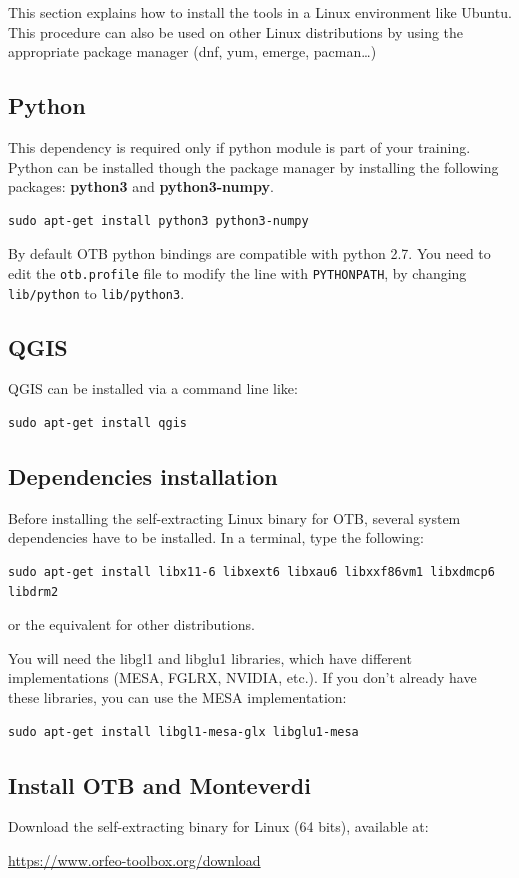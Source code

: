 \documentclass[10pt,a4paper]{article}
\begin{document}
This section explains how to install the tools in a Linux environment like Ubuntu. This procedure can also be used on other Linux distributions by using the appropriate package manager (dnf, yum,
emerge, pacman\ldots)

\subsection{Python}

This dependency is required only if python module is part of your training. Python can be installed though the package manager by installing the following packages: \textbf{python3} and \textbf{python3-numpy}.
\begin{verbatim}
sudo apt-get install python3 python3-numpy
\end{verbatim}

By default OTB python bindings are compatible with python 2.7. You need to edit the \verb?otb.profile? file to modify the line with \verb?PYTHONPATH?, by changing \verb?lib/python? to \verb?lib/python3?.

\subsection{QGIS}
QGIS can be installed via a command line like:
\begin{verbatim}
sudo apt-get install qgis
\end{verbatim}

\subsection{Dependencies installation}
Before installing the self-extracting Linux binary for OTB, several system dependencies have to be installed. In a terminal, type the following:
\begin{verbatim}
sudo apt-get install libx11-6 libxext6 libxau6 libxxf86vm1 libxdmcp6 libdrm2
\end{verbatim}
or the equivalent for other distributions.

You will need the libgl1 and libglu1 libraries, which have different implementations (MESA, FGLRX, NVIDIA, etc.). If you don't already have these libraries, you can use the MESA implementation:
\begin{verbatim}
sudo apt-get install libgl1-mesa-glx libglu1-mesa
\end{verbatim}

\subsection{Install OTB and Monteverdi}
Download the self-extracting binary for Linux (64 bits), available at:
\begin{center}
\url{https://www.orfeo-toolbox.org/download}
\end{center}
\end{document}
